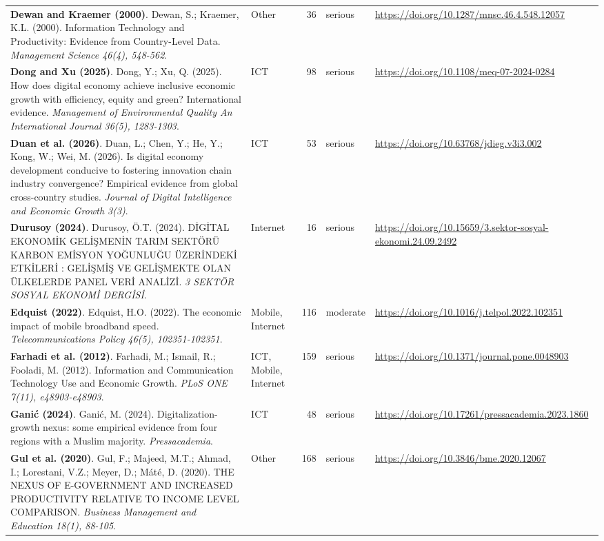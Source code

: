 {\begin{longtable}{@{}p{7.4cm} p{1.3cm} r l p{3.4cm}@{}}
\textbf{Dewan and Kraemer (2000)}. Dewan, S.; Kraemer, K.L. (2000). Information Technology and Productivity: Evidence from Country-Level Data. \emph{Management Science 46(4), 548-562}. & Other & 36 & serious & \url{https://doi.org/10.1287/mnsc.46.4.548.12057} \\
\textbf{Dong and Xu (2025)}. Dong, Y.; Xu, Q. (2025). How does digital economy achieve inclusive economic growth with efficiency, equity and green? International evidence. \emph{Management of Environmental Quality An International Journal 36(5), 1283-1303}. & ICT & 98 & serious & \url{https://doi.org/10.1108/meq-07-2024-0284} \\
\textbf{Duan et al. (2026)}. Duan, L.; Chen, Y.; He, Y.; Kong, W.; Wei, M. (2026). Is digital economy development conducive to fostering innovation chain industry convergence? Empirical evidence from global cross-country studies. \emph{Journal of Digital Intelligence and Economic Growth 3(3)}. & ICT & 53 & serious & \url{https://doi.org/10.63768/jdieg.v3i3.002} \\
\textbf{Durusoy (2024)}. Durusoy, Ö.T. (2024). DİGİTAL EKONOMİK GELİŞMENİN TARIM SEKTÖRÜ KARBON EMİSYON YOĞUNLUĞU ÜZERİNDEKİ ETKİLERİ : GELİŞMİŞ VE GELİŞMEKTE OLAN ÜLKELERDE PANEL VERİ ANALİZİ. \emph{3 SEKTÖR SOSYAL EKONOMİ DERGİSİ}. & Internet & 16 & serious & \url{https://doi.org/10.15659/3.sektor-sosyal-ekonomi.24.09.2492} \\
\textbf{Edquist (2022)}. Edquist, H.O. (2022). The economic impact of mobile broadband speed. \emph{Telecommunications Policy 46(5), 102351-102351}. & Mobile, Internet & 116 & moderate & \url{https://doi.org/10.1016/j.telpol.2022.102351} \\
\textbf{Farhadi et al. (2012)}. Farhadi, M.; Ismail, R.; Fooladi, M. (2012). Information and Communication Technology Use and Economic Growth. \emph{PLoS ONE 7(11), e48903-e48903}. & ICT, Mobile, Internet & 159 & serious & \url{https://doi.org/10.1371/journal.pone.0048903} \\
\textbf{Ganić (2024)}. Ganić, M. (2024). Digitalization-growth nexus: some empirical evidence from four regions with a Muslim majority. \emph{Pressacademia}. & ICT & 48 & serious & \url{https://doi.org/10.17261/pressacademia.2023.1860} \\
\textbf{Gul et al. (2020)}. Gul, F.; Majeed, M.T.; Ahmad, I.; Lorestani, V.Z.; Meyer, D.; Máté, D. (2020). THE NEXUS OF E-GOVERNMENT AND INCREASED PRODUCTIVITY RELATIVE TO INCOME LEVEL COMPARISON. \emph{Business Management and Education 18(1), 88-105}. & Other & 168 & serious & \url{https://doi.org/10.3846/bme.2020.12067} \\

\end{longtable}}
